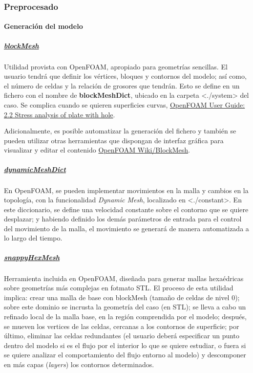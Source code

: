 \subsubsection{Preprocesado}\label{header-n68}

\paragraph{Generación del modelo}\label{header-n69}

\subparagraph{\texorpdfstring{
\href{https://cfd.direct/openfoam/user-guide/blockmesh/}{blockMesh}}{blockMesh}}\label{header-n71}

Utilidad provista con OpenFOAM, apropiado para geometrías sencillas. El
usuario tendrá que definir los vértices, bloques y contornos del modelo;
así como, el número de celdas y la relación de grosores que tendrán.
Esto se define en un fichero con el nombre de \textbf{blockMeshDict},
ubicado en la carpeta \textless{}./system\textgreater{} del caso. Se
complica cuando se quieren superficies curvas,
\href{https://cfd.direct/openfoam/user-guide/plateHole/\#x6-400002.2.1}{OpenFOAM
User Guide: 2.2 Stress analysis of plate with hole}.

Adicionalmente, es posible automatizar la generación del fichero y
también se pueden utilizar otras herramientas que dispongan de interfaz
gráfica para visualizar y editar el contenido
\href{https://openfoamwiki.net/index.php/BlockMesh}{OpenFOAM
Wiki/BlockMesh}.

\subparagraph{\texorpdfstring{
\href{https://es.slideshare.net/fumiyanozaki96/openfoam}{dynamicMeshDict}}{dynamicMeshDict}}\label{header-n76}

En OpenFOAM, se pueden implementar movimientos en la malla y cambios en
la topología, con la funcionalidad \emph{Dynamic Mesh}, localizado en
\textless{}./constant\textgreater{}. En este diccionario, se define una
velocidad constante sobre el contorno que se quiere desplazar; y
habiendo definido los demás parámetros de entrada para el control del
movimiento de la malla, el movimiento se generará de manera automatizada
a lo largo del tiempo.

\subparagraph{\texorpdfstring{
\href{https://cfd.direct/openfoam/user-guide/snappyhexmesh/}{snappyHexMesh}}{snappyHexMesh}}\label{header-n79}

Herramienta incluida en OpenFOAM, diseñada para generar mallas
hexaédricas sobre geometrías más complejas en fotmato STL. El proceso de
esta utilidad implica: crear una malla de base con blockMesh (tamaño de
celdas de nivel 0); sobre este dominio se incrusta la geometría del caso
(en STL); se lleva a cabo un refinado local de la malla base, en la
región comprendida por el modelo; después, se mueven los vertices de las
celdas, cercanas a los contornos de superficie; por último, eliminar las
celdas redundantes (el usuario deberá especificar un punto dentro del
modelo si es el flujo por el interior lo que se quiere estudiar, o fuera
si se quiere analizar el comportamiento del flujo entorno al modelo) y
descomponer en más capas (\emph{layers}) los contornos determinados.

